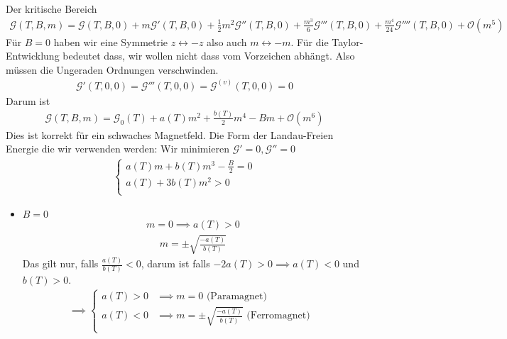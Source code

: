 \begin{description}
\begin{enumerate}[A)]
    Der kritische Bereich
    \begin{align*}
      \mathcal{G}(T, B, m) = \mathcal{G}(T, B, 0) + m \mathcal{G}'(T, B, 0) +
      \frac{1}{2} m^2 \mathcal{G}''(T, B, 0) + \frac{m^3}{6} \mathcal{G}'''(T, B, 0)
      + \frac{m^4}{24} \mathcal{G}''''(T, B, 0) + \mathcal{O}(m^5)
    \end{align*}
    Für $B=0$ haben wir eine Symmetrie $z \leftrightarrow - z$ also
    auch $m \leftrightarrow - m$. Für die Taylor-Entwicklung bedeutet dass,
    wir wollen nicht dass vom Vorzeichen abhängt. Also müssen die Ungeraden Ordnungen verschwinden.
    \begin{align*}
      \mathcal{G}'(T, 0, 0) = \mathcal{G}'''(T, 0, 0) = \mathcal{G}^{(v)}(T, 0, 0) = 0
    \end{align*}
    Darum ist
    \begin{align*}
      \mathcal{G}(T, B, m) = \mathcal{G}_0(T) + a(T) m^2 + \frac{b(T)}{2}m^4 - B m + \mathcal{O}(m^6)
    \end{align*}
    Dies ist korrekt für ein schwaches Magnetfeld. Die Form der Landau-Freien Energie
    die wir verwenden werden:
    Wir minimieren $\mathcal{G}' = 0, \mathcal{G}''=0$
    \begin{align*}
      \begin{cases}
        a(T)m + b(T)m^3 - \frac{B}{2} = 0 \\
        a(T) + 3 b(T)m^2  > 0 \\
      \end{cases}
    \end{align*}
    \begin{itemize}
      \item $B=0$ \\
        \begin{align*}
          m = 0 \implies a(T) > 0
        \end{align*}
        \begin{align*}
          m = \pm \sqrt{\frac{-a(T)}{b(T)}}
        \end{align*}
        Das gilt nur, falls $\frac{a(T)}{b(T)} < 0 $, darum
        ist falls $- 2 a(T) > 0 \implies a(T) < 0 $  und
        $b(T) > 0$.
        \begin{align*}
          \implies
          \begin{cases}
            a(T) > 0 & \implies m = 0 \text{ (Paramagnet)} \\
            a(T) < 0 & \implies m = \pm \sqrt{\frac{-a(T)}{b(T)}} \text{ (Ferromagnet) } \\

\end{cases}
\end{align*}
\end{itemize}
\end{enumerate}
\end{description}
